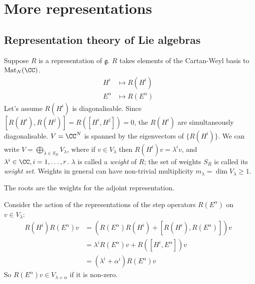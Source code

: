 \documentclass{jknotes}
\begin{document}
\begin{eg}
\begin{figure}[H]
    \end{figure}
\end{eg}

\section{More representations}
\subsection{Representation theory of Lie algebras}

Suppose \(R\) is a representation of \(\mathfrak{g}\). \(R\) takes elements of the Cartan-Weyl basis to \(\operatorname{Mat}_N(\CC)\).
\begin{align}
    H^i &\mapsto R(H^i) \\
    E^\alpha &\mapsto R(E^\alpha)
\end{align}
Let's assume \(R(H^i)\) is diagonalisable. Since \([R(H^i),R(H^j)] = R([H^i,H^j]) = 0\), the \(R(H^i)\) are simultaneously diagonalisable. \(V=\CC^N\) is spanned by the eigenvectors of \(\{R(H^i)\}\). We can write \(V=\bigoplus_{\lambda\in S_R}V_\lambda\), where if \(v \in V_\lambda\) then \(R(H^i)v=\lambda^iv\), and \(\lambda^i \in \CC, i=1,\dots,r\). \(\lambda\) is called a \emph{weight} of \(R\); the set of weights \(S_R\) is called its \emph{weight set}. Weights in general can have non-trivial multiplicity \(m_\lambda= \dim V_\lambda \ge 1\).
\begin{eg}
    The roots are the weights for the adjoint representation.
\end{eg}
Consider the action of the representations of the step operators \(R(E^\alpha)\) on \(v \in V_\lambda\):
\begin{align}
    R(H^i)R(E^\alpha)v &= (R(E^\alpha)R(H^i) + [R(H^i),R(E^\alpha)])v \\
    &= \lambda^i R(E^\alpha)v + R([H^i,E^\alpha])v \\
    &= (\lambda^i + \alpha^i)R(E^\alpha)v
\end{align}
So \(R(E^{\alpha})v \in V_{\lambda+\alpha}\) if it is non-zero.
\end{document}
